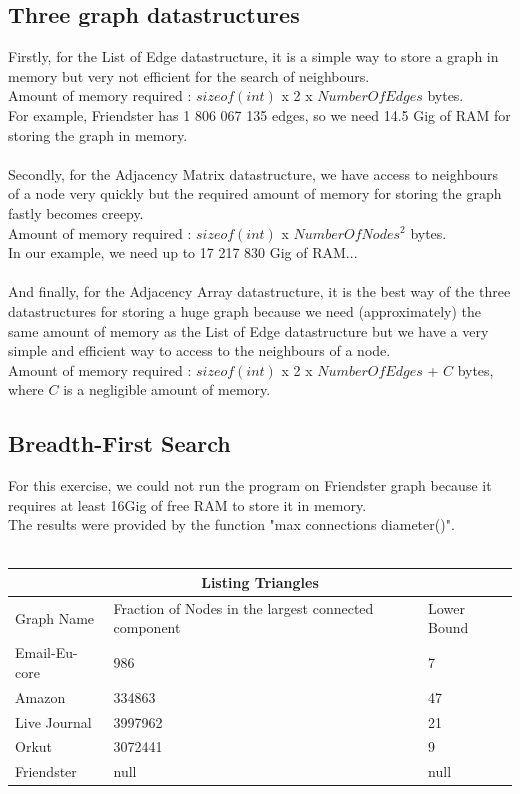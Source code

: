 \documentclass{article}
\begin{document}
\subsection{Three graph datastructures}
Firstly, for the List of Edge datastructure, it is a simple way to store a graph in memory but very not efficient for the search of neighbours.\\ Amount of memory required : $sizeof(int)$ x 2 x $NumberOfEdges$ bytes.\\
For example, Friendster has 1 806 067 135 edges, so we need 14.5 Gig of RAM for storing the graph in memory.\\ \\
Secondly, for the Adjacency Matrix datastructure, we have access to neighbours of a node very quickly but the required amount of memory for storing the graph fastly becomes creepy.\\ Amount of memory required : $sizeof(int)$ x $NumberOfNodes^{2}$ bytes.\\
In our example, we need up to 17 217 830 Gig of RAM... \\ \\
And finally, for the Adjacency Array datastructure, it is the best way of the three datastructures for storing a huge graph because we need (approximately) the same amount of memory as the List of Edge datastructure but we have a very simple and efficient way to access to the neighbours of a node.\\ Amount of memory required : $sizeof(int)$ x 2 x $NumberOfEdges$ + $C$ bytes, where $C$ is a negligible amount of memory.

\clearpage

\subsection{Breadth-First Search}
For this exercise, we could not run the program on Friendster graph because it requires at least 16Gig of free RAM to store it in memory.\\
The results were provided by the function "max connections diameter()".\\ \\
\begin{tabular}{ |p{3.7cm}||p{3.7cm}|p{3.7cm}|  }
 \hline
 \multicolumn{3}{|c|}{ Listing Triangles } \\
 \hline
 Graph Name & Fraction of Nodes in the largest connected component & Lower Bound\\
 \hline
 Email-Eu-core & 986 & 7 \\
 Amazon & 334863 & 47\\
 Live Journal & 3997962 & 21\\
 Orkut & 3072441 & 9 \\
 Friendster & null & null\\
 \hline
\end{tabular}
\end{document}
